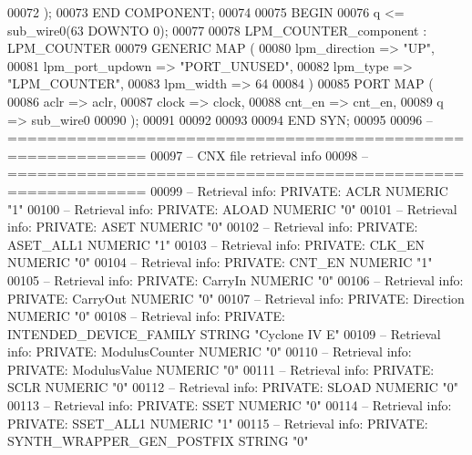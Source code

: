 \begin{DoxyCode}
{00072     );
00073     \textcolor{keywordflow}{END} \textcolor{keywordflow}{COMPONENT};
00074 
00075 \textcolor{vhdlkeyword}{BEGIN}
00076     \textcolor{vhdlchar}{q}    \textcolor{vhdlchar}{<=} \textcolor{vhdlchar}{sub_wire0}\textcolor{vhdlchar}{(}\textcolor{vhdllogic}{}\textcolor{vhdllogic}{63} \textcolor{keywordflow}{DOWNTO} \textcolor{vhdllogic}{}\textcolor{vhdllogic}{0}\textcolor{vhdlchar}{)};
00077 
00078     LPM\_COUNTER\_component : LPM\_COUNTER
00079     \textcolor{keywordflow}{GENERIC} \textcolor{keywordflow}{MAP} (
00080         lpm\_direction => \textcolor{keyword}{"UP"},
00081         lpm\_port\_updown => \textcolor{keyword}{"PORT\_UNUSED"},
00082         lpm\_type => \textcolor{keyword}{"LPM\_COUNTER"},
00083         lpm\_width => \textcolor{vhdllogic}{64}
00084     \textcolor{vhdlchar}{)}
00085     \textcolor{keywordflow}{PORT} \textcolor{keywordflow}{MAP} (
00086         aclr => aclr,
00087         clock => clock,
00088         cnt\_en => cnt_en,
00089         q => sub_wire0
00090     \textcolor{vhdlchar}{)};
00091 
00092 
00093 
00094 \textcolor{keywordflow}{END} \textcolor{vhdlchar}{SYN};
00095 
00096 \textcolor{keyword}{-- ============================================================}
00097 \textcolor{keyword}{-- CNX file retrieval info}
00098 \textcolor{keyword}{-- ============================================================}
00099 \textcolor{keyword}{-- Retrieval info: PRIVATE: ACLR NUMERIC "1"}
00100 \textcolor{keyword}{-- Retrieval info: PRIVATE: ALOAD NUMERIC "0"}
00101 \textcolor{keyword}{-- Retrieval info: PRIVATE: ASET NUMERIC "0"}
00102 \textcolor{keyword}{-- Retrieval info: PRIVATE: ASET\_ALL1 NUMERIC "1"}
00103 \textcolor{keyword}{-- Retrieval info: PRIVATE: CLK\_EN NUMERIC "0"}
00104 \textcolor{keyword}{-- Retrieval info: PRIVATE: CNT\_EN NUMERIC "1"}
00105 \textcolor{keyword}{-- Retrieval info: PRIVATE: CarryIn NUMERIC "0"}
00106 \textcolor{keyword}{-- Retrieval info: PRIVATE: CarryOut NUMERIC "0"}
00107 \textcolor{keyword}{-- Retrieval info: PRIVATE: Direction NUMERIC "0"}
00108 \textcolor{keyword}{-- Retrieval info: PRIVATE: INTENDED\_DEVICE\_FAMILY STRING "Cyclone IV E"}
00109 \textcolor{keyword}{-- Retrieval info: PRIVATE: ModulusCounter NUMERIC "0"}
00110 \textcolor{keyword}{-- Retrieval info: PRIVATE: ModulusValue NUMERIC "0"}
00111 \textcolor{keyword}{-- Retrieval info: PRIVATE: SCLR NUMERIC "0"}
00112 \textcolor{keyword}{-- Retrieval info: PRIVATE: SLOAD NUMERIC "0"}
00113 \textcolor{keyword}{-- Retrieval info: PRIVATE: SSET NUMERIC "0"}
00114 \textcolor{keyword}{-- Retrieval info: PRIVATE: SSET\_ALL1 NUMERIC "1"}
00115 \textcolor{keyword}{-- Retrieval info: PRIVATE: SYNTH\_WRAPPER\_GEN\_POSTFIX STRING "0"}
}
\end{DoxyCode}

